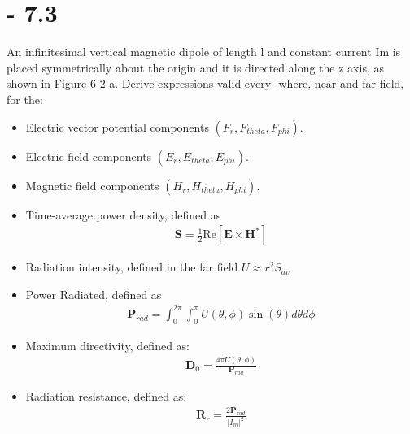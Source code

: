 \documentclass[12pt]{article}
\begin{document}
\section{- 7.3}
An infinitesimal vertical magnetic dipole of length l and constant current Im is placed symmetrically about the origin and it is directed along the z axis, as shown in Figure 6-2 a. Derive expressions valid every- where, near and far field, for the:
\begin{itemize}
\item Electric vector potential components $(F_r , F_{theta} , F_{phi} )$.
\item Electric field components $(E_r , E_{theta} , E_{phi} )$.
\item Magnetic field components $(H_r , H_{theta} , H_{phi} )$.
\item Time-average power density, defined as \\
  \begin{align*}
  \mathbf{S} = \frac{1}{2}\text{Re}{[\mathbf{E}\times\mathbf{H}^*]}
  \end{align*}
\item  Radiation intensity, defined in the far field $U \approx r^2S_{av}$
  \item Power Radiated, defined as \\
  \begin{align*}
  \mathbf{P}_{rad} = \int_0^{2\pi}\int_0^{\pi}U(\theta,\phi)\sin{(\theta)}d\theta d\phi
  \end{align*}
\item Maximum directivity, defined as:
  \begin{align*}
  \mathbf{D}_{0} = \frac{4\pi U(\theta,\phi)}{\mathbf{P}_{rad}}
  \end{align*}
\item Radiation resistance, defined as:
  \begin{align*}
  \mathbf{R}_{r} = \frac{2\mathbf{P}_{rad}}{|I_m|^2}
  \end{align*}
\end{itemize}
\newpage
\textcolor{white}{  }
\newpage
\textcolor{white}{  }
\newpage
\end{document}
